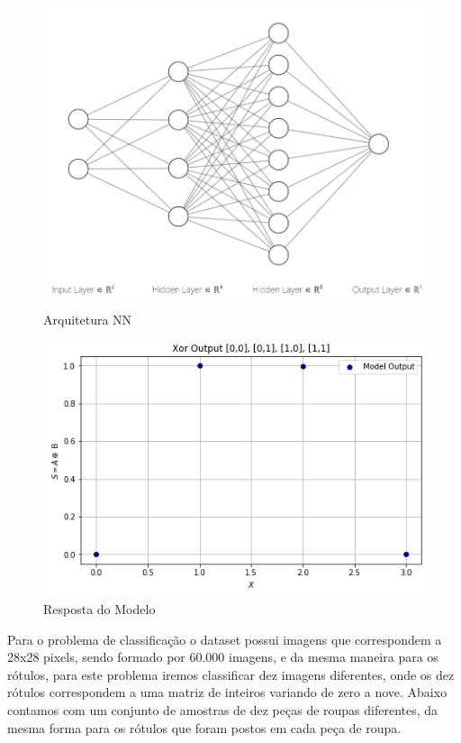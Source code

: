\documentclass[12pt,openright,openany,oneside,article,a4paper,brazi]{abntex2}
\begin{document}
\begin{figure}[!htb]
  \begin{minipage}[!]{0.55\linewidth}
  \includegraphics[scale=0.4]{Arquitetura_NN_XOR.PNG}
  \caption{Arquitetura NN}
  \label{fig:}
  \end{minipage}
  \begin{minipage}[!]{0.55\linewidth}
  \includegraphics[scale=0.6]{NN_Resposta_Xor.PNG}
  \caption{Resposta do Modelo}
  \label{fig:}
  \end{minipage}
\end{figure}

Para o problema de classificação o dataset possui imagens que correspondem a 28x28 pixels, sendo formado por 60.000 imagens, e da mesma maneira
para os rótulos, para este problema iremos classificar dez imagens diferentes, onde os dez rótulos correspondem a uma matriz de inteiros variando de zero a nove. Abaixo contamos com um conjunto de amostras de dez peças de roupas
diferentes, da mesma forma para os rótulos que foram postos em cada peça de roupa. \\ \\
\end{document}
